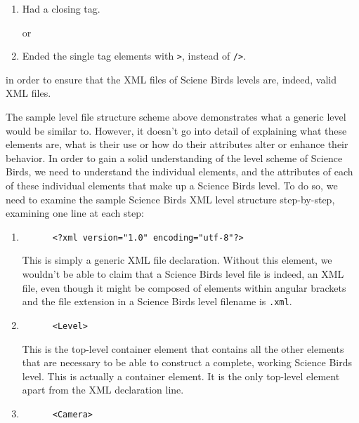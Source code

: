 \documentclass[12pt]{dalthesis}
\begin{document}
\begin{enumerate}
  \begin{enumerate}
    \item Had a closing tag.

    or

    \item Ended the single tag elements with \lstinline{>}, instead of \lstinline{/>}.
  \end{enumerate}

  in order to ensure that the XML files of Sciene Birds levels are, indeed, valid XML files.

  The sample level file structure scheme above demonstrates what a generic level would be similar to. However, it doesn't go into detail of explaining what these elements are, what is their use or how do their attributes alter or enhance their behavior. In order to gain a solid understanding of the level scheme of Science Birds, we need to understand the individual elements, and the attributes of each of these individual elements that make up a Science Birds level. To do so, we need to examine the sample Science Birds XML level structure step-by-step, examining one line at each step:

  \begin{enumerate}
    \item

    \begin{lstlisting}
      <?xml version="1.0" encoding="utf-8"?>
    \end{lstlisting}

    This is simply a generic XML file declaration. Without this element, we wouldn't be able to claim that a Science Birds level file is indeed, an XML file, even though it might be composed of elements within angular brackets and the file extension in a Science Birds level filename is \lstinline{.xml}.

    \item

    \begin{lstlisting}
      <Level>
    \end{lstlisting}

    This is the top-level container element that contains all the other elements that are necessary to be able to construct a complete, working Science Birds level. This is actually a container element. It is the only top-level element apart from the XML declaration line.

    \item

    \begin{lstlisting}
      <Camera>
    \end{lstlisting}


\end{enumerate}
\end{enumerate}
\end{document}
